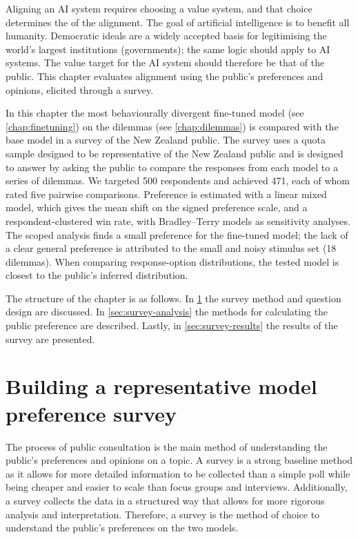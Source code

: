 Aligning an AI system requires choosing a value system, and that choice determines the  of the alignment. The goal of artificial intelligence is to benefit all humanity. Democratic ideals are a widely accepted basis for legitimising the world's largest institutions (governments); the same logic should apply to AI systems. The value target for the AI system should therefore be that of the public. This chapter evaluates alignment using the public's preferences and opinions, elicited through a survey.

In this chapter the most behaviourally divergent fine-tuned model (see \ref{chap:finetuning}) on the dilemmas (see \ref{chap:dilemmas}) is compared with the base model in a survey of the New Zealand public. The survey uses a quota sample designed to be representative of the New Zealand public and is designed to answer  by asking the public to compare the responses from each model to a series of dilemmas. We targeted 500 respondents and achieved 471, each of whom rated five pairwise comparisons. Preference is estimated with a linear mixed model, which gives the mean shift on the signed preference scale, and a respondent-clustered win rate, with Bradley–Terry models as sensitivity analyses. The scoped analysis finds a small preference for the fine-tuned model; the lack of a clear general preference is attributed to the small and noisy stimulus set (18 dilemmas). When comparing response-option distributions, the tested model is closest to the public's inferred distribution.

The structure of the chapter is as follows. In \ref{sec:survey-construction} the survey method and question design are discussed. In \ref{sec:survey-analysis} the methods for calculating the public preference are described. Lastly, in \ref{sec:survey-results} the results of the survey are presented.

\section{Building a representative model preference survey}
\label{sec:survey-construction}

The process of public consultation is the main method of understanding the public's preferences and opinions on a topic. A survey is a strong baseline method as it allows for more detailed information to be collected than a simple poll while being cheaper and easier to scale than focus groups and interviews. Additionally, a survey collects the data in a structured way that allows for more rigorous analysis and interpretation. Therefore, a survey is the method of choice to understand the public's preferences on the two models.

